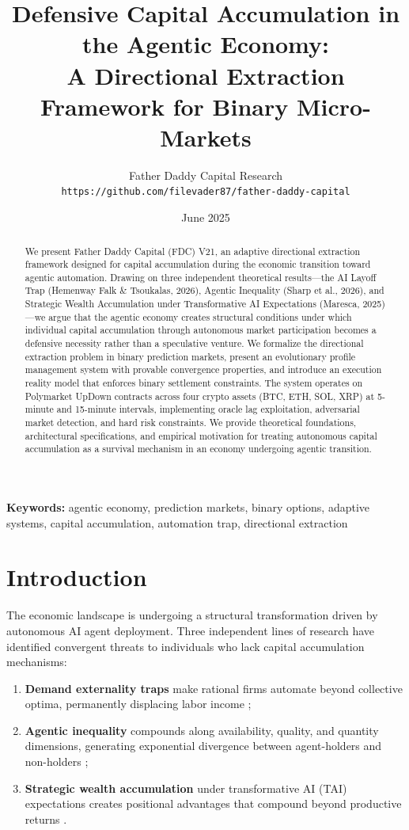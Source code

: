 \documentclass[11pt,a4paper]{article}
\title{\Large\bfseries Defensive Capital Accumulation in the Agentic Economy:\\
A Directional Extraction Framework for Binary Micro-Markets}
\author{
    Father Daddy Capital Research\\
    \texttt{https://github.com/filevader87/father-daddy-capital}
}
\date{June 2025}
\begin{document}
\maketitle

\begin{abstract}
We present Father Daddy Capital (FDC) V21, an adaptive directional extraction framework designed for capital accumulation during the economic transition toward agentic automation. Drawing on three independent theoretical results---the AI Layoff Trap (Hemenway Falk \& Tsoukalas, 2026), Agentic Inequality (Sharp et al., 2026), and Strategic Wealth Accumulation under Transformative AI Expectations (Maresca, 2025)---we argue that the agentic economy creates structural conditions under which individual capital accumulation through autonomous market participation becomes a defensive necessity rather than a speculative venture. We formalize the directional extraction problem in binary prediction markets, present an evolutionary profile management system with provable convergence properties, and introduce an execution reality model that enforces binary settlement constraints. The system operates on Polymarket UpDown contracts across four crypto assets (BTC, ETH, SOL, XRP) at 5-minute and 15-minute intervals, implementing oracle lag exploitation, adversarial market detection, and hard risk constraints. We provide theoretical foundations, architectural specifications, and empirical motivation for treating autonomous capital accumulation as a survival mechanism in an economy undergoing agentic transition.
\end{abstract}

\textbf{Keywords:} agentic economy, prediction markets, binary options, adaptive systems, capital accumulation, automation trap, directional extraction

\section{Introduction}

The economic landscape is undergoing a structural transformation driven by autonomous AI agent deployment. Three independent lines of research have identified convergent threats to individuals who lack capital accumulation mechanisms:

\begin{enumerate}
    \item \textbf{Demand externality traps} make rational firms automate beyond collective optima, permanently displacing labor income \citep{hemenway2026ai};
    \item \textbf{Agentic inequality} compounds along availability, quality, and quantity dimensions, generating exponential divergence between agent-holders and non-holders \citep{sharp2026agentic};
    \item \textbf{Strategic wealth accumulation} under transformative AI (TAI) expectations creates positional advantages that compound beyond productive returns \citep{maresca2025strategic}.
\end{enumerate}
\end{document}

